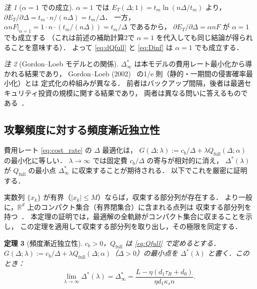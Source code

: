 \documentclass[12pt,a4paper]{article}
\theoremstyle{plain}
\newtheorem{theorem}{定理}[section]
\theoremstyle{definition}
\theoremstyle{remark}
\newtheorem{remark}[theorem]{注}
\newcommand{\Qf}{Q_{\mathrm{full}}}
\newcommand{\Dopt}{\Delta^{*}}
\newcommand{\Dinf}{\Delta^{*}_{\infty}}
\begin{document}
\begin{remark}[$\alpha=1$ での成立]\label{rem:alpha1}
$\alpha=1$ では $E_T(\Delta;1)=t_m\ln(n\Delta/t_m)$ より，
$\partial E_T/\partial\Delta=t_m\cdot n/(n\Delta)=t_m/\Delta$．
一方，$\alpha nF|_{\alpha=1}=1\cdot n\cdot(t_m/(n\Delta))=t_m/\Delta$ であるから，
$\partial E_T/\partial\Delta=\alpha nF$ が $\alpha=1$ でも成立する
（これは前述の補助計算2で $\alpha=1$ を代入しても同じ結論が得られることを意味する）．
よって \eqref{eq:dQfull} と \eqref{eq:Dinf} は $\alpha=1$ でも成立する．
\end{remark}

\begin{remark}[Gordon--Loeb モデルとの関係]\label{rem:gl}
$\Dinf$ は本モデルの費用レート最小化から導かれる結果であり，
Gordon--Loeb (2002)~\cite{gordon2002} の1/e 則（静的・一期間の侵害確率最小化）とは
定式化の枠組みが異なる．
前者はバックアップ間隔，後者は最適セキュリティ投資の規模に関する結果であり，
両者は異なる問いに答えるものである~\cite{gordon2010,fielder2016}．
\end{remark}

\subsection{攻撃頻度に対する頻度漸近独立性}

費用レート \eqref{eq:cost_rate} の $\Delta$ 最適化は，
$G(\Delta;\lambda):=c_b/\Delta+\lambda\Qf(\Delta;\alpha)$ の最小化に等しい．
$\lambda\to\infty$ では固定費 $c_b/\Delta$ の寄与が相対的に消え，
$\Dopt(\lambda)$ が $\Qf$ の最小点 $\Dinf$ に収束することが期待される．
以下でこれを厳密に証明する．

\begin{tcolorbox}[mathbox, title={Bolzano-Weierstrass の定理}]
実数列 $\{x_k\}$ が有界（$|x_k|\le M$）ならば，収束する部分列が存在する．
より一般に，$\mathbb{R}^d$ 上のコンパクト集合（有界閉集合）に含まれる点列は
収束する部分列を持つ~\cite{rudin1976,rockafellar1970}．
本定理の証明では，最適解の全軌跡がコンパクト集合に収まることを示し，
この定理を適用して収束する部分列を取り出し，その極限を同定する．
\end{tcolorbox}

\begin{theorem}[頻度漸近独立性]\label{thm:convergence}
$c_b>0$，$\Qf$ は \eqref{eq:Qfull} で定めるとする．
$G(\Delta;\lambda):=c_b/\Delta+\lambda\Qf(\Delta;\alpha)$（$\Delta>0$）の最小点を
$\Dopt(\lambda)$ と書く．このとき：
\begin{equation}\label{eq:limit}
\lim_{\lambda\to\infty}\Dopt(\lambda)=\Dinf=\frac{L-\eta(d_1\tau_R+d_0)}{\eta d_1\kappa_s n}.
\end{equation}
\end{theorem}
\end{document}
